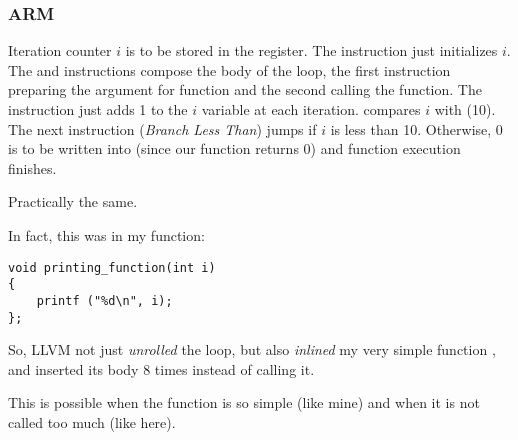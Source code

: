 \subsubsection{ARM}

\myparagraph{\NonOptimizingKeilVI (\ARMMode)}



Iteration counter $i$ is to be stored in the  register.
The  instruction just initializes $i$.
The  and  instructions
compose the body of the loop, the first instruction preparing the argument for 
\ttf function and the second calling the function.
The  instruction just adds 1 to the $i$ variable at each iteration.
 compares $i$ with  (10). 
The next instruction  (\emph{Branch Less Than}) jumps if $i$ is less than 10.
Otherwise, 0 is to be written into  (since our function returns 0)
and function execution finishes.

\myparagraph{\OptimizingKeilVI (\ThumbMode)}



Practically the same.

\myparagraph{\OptimizingXcodeIV (\ThumbTwoMode)}
\label{ARM_unrolled_loops}



In fact, this was in my \ttf function:

\begin{lstlisting}[style=customc]
void printing_function(int i)
{
    printf ("%d\n", i);
};
\end{lstlisting}

So, LLVM not just \emph{unrolled} the loop, 
but also \emph{inlined} my 
very simple function \ttf,
and inserted its body 8 times instead of calling it. 

This is possible when the function is so simple (like mine) and when it is not called too much (like here).







